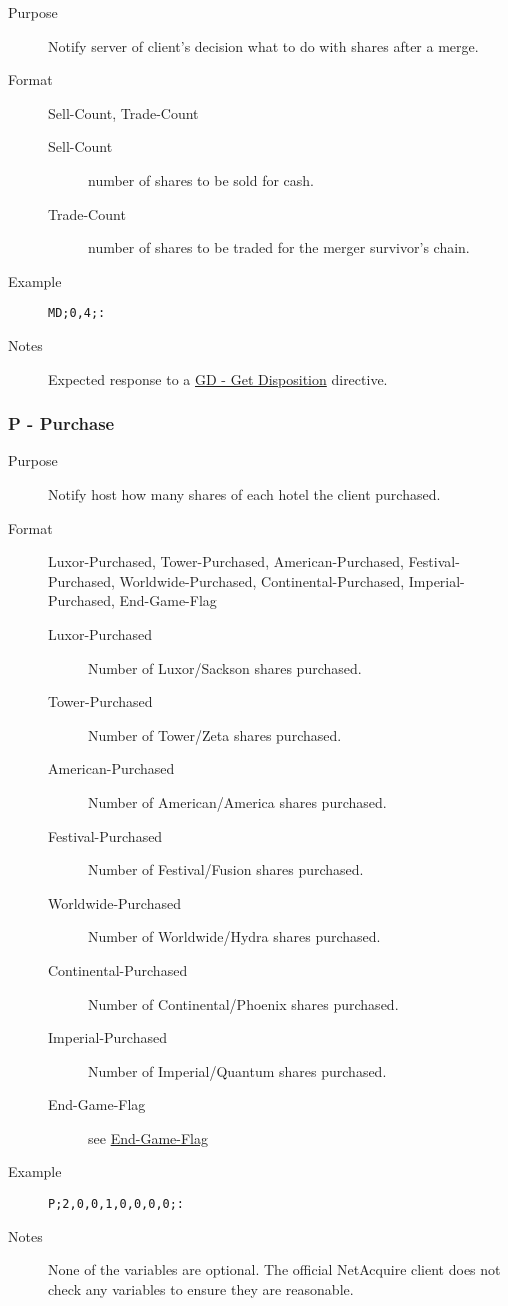 \documentclass{article}
\providecommand{\wiredata}[1]{\texttt{{#1}}}
\begin{document}
\begin{description}
  \item[Purpose] Notify server of client's decision what to do with shares after a merge.
  \item[Format] Sell-Count, Trade-Count
  \begin{description}
    \item[Sell-Count] number of shares to be sold for cash.
    \item[Trade-Count] number of shares to be traded for the merger survivor's chain.
  \end{description}
  \item[Example] \wiredata{MD;0,4;:}
  \item[Notes] Expected response to a \hyperref[ssub:gd_get_disposition]{GD - Get Disposition} directive.
\end{description}


\subsubsection{P - Purchase} %
\label{ssub:p_purchase}

\begin{description}
  \item[Purpose] Notify host how many shares of each hotel the client purchased.
  \item[Format] Luxor-Purchased, Tower-Purchased, American-Purchased, Festival-Purchased, Worldwide-Purchased, Continental-Purchased, Imperial-Purchased, End-Game-Flag
  \begin{description}
    \item[Luxor-Purchased] Number of Luxor/Sackson shares purchased.
    \item[Tower-Purchased] Number of Tower/Zeta shares purchased.
    \item[American-Purchased] Number of American/America shares purchased.
    \item[Festival-Purchased] Number of Festival/Fusion shares purchased.
    \item[Worldwide-Purchased] Number of Worldwide/Hydra shares purchased.
    \item[Continental-Purchased] Number of Continental/Phoenix shares purchased.
    \item[Imperial-Purchased] Number of Imperial/Quantum shares purchased.
    \item[End-Game-Flag] see \hyperref[ssub:end_game_flag]{End-Game-Flag}
  \end{description}
  \item[Example] \wiredata{P;2,0,0,1,0,0,0,0;:}
  \item[Notes] None of the variables are optional. The official NetAcquire client does not check any variables to ensure they are reasonable.
\end{description}
\end{document}

